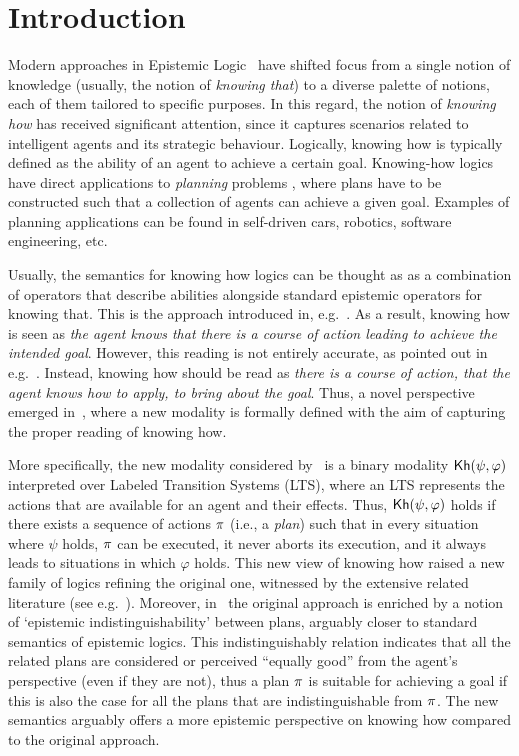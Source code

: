 \section{Introduction}
\label{sec:intro}

Modern approaches in Epistemic Logic~\cite{vonWright:1951,Hintikka:1962} have shifted focus from a single notion of knowledge (usually, the notion of \emph{knowing that}) to a diverse palette of notions, each of them tailored to specific purposes. In this regard, the notion of \emph{knowing how} has received significant attention, since it captures scenarios related to intelligent agents and its strategic behaviour. Logically, knowing how is typically defined as the ability of an agent to achieve a certain goal.  Knowing-how logics have direct applications to \emph{planning} problems \cite{Stuart21},  where  plans have to be constructed such that a collection of agents can achieve a given goal.  Examples of planning applications can be found in self-driven cars,  robotics, software engineering, etc.

Usually,  the semantics for knowing how logics can be thought as as a combination of operators that describe abilities alongside standard epistemic operators for knowing that.  This is the approach introduced in, e.g.~\cite{Mccarthy69,Moore85,Les00,Hoek00,HerzigT06}. As a result, knowing how is seen as \emph{the agent knows that there is a course of action leading to achieve the intended goal}. However, this reading is not entirely accurate, as pointed out in e.g.~\cite{JamrogaA07,Herzig15}. Instead, knowing how should be read as \emph{there is a course of action, that the agent knows how to apply, to bring about the goal}. Thus, a novel perspective emerged in~\cite{Wang15lori,Wang16,Wang2016}, where a new modality is formally defined with the aim of capturing the proper reading of knowing how. 

More specifically, the new modality considered by~\cite{Wang15lori,Wang16,Wang2016} is a binary modality ${\mathsf{Kh}}(\psi,\varphi)$ interpreted over Labeled Transition Systems (LTS), where an LTS represents the  actions that are available for an agent and their effects. Thus, ${\mathsf{Kh}}(\psi,\varphi)$ holds if there exists a sequence of actions $\pi$ (i.e., a \emph{plan}) such that in every situation where $\psi$ holds, $\pi$ can be executed, it never aborts its execution, and it always leads to situations in which $\varphi$ holds. This new view of knowing how raised a new family of logics refining the original one, witnessed by the extensive related literature (see e.g.~\cite{LiWang17,Li17,Li17bis,FervariHLW17,LiW21,NaumovT17,NaumovT18,NaumovT19,Naumov2018a}). Moreover, in~\cite{AFSVQ21,AFSVQ23} the original approach is enriched by a notion of `epistemic indistinguishability' between plans, arguably closer to standard semantics of epistemic logics. This indistinguishably relation indicates that all the related plans are considered or perceived ``equally good''
from the agent's perspective (even if they are not), thus a plan $\pi$ is suitable for achieving a goal if this is also the case for all the plans that are indistinguishable from $\pi$. The new semantics arguably offers a more epistemic perspective on knowing how compared to the original approach.

